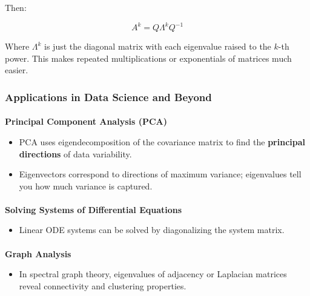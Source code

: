 \documentclass[
  letterpaper,
  DIV=11,
  numbers=noendperiod]{scrartcl}
\makeatletter
\let\oldparagraph\paragraph
\renewcommand{\paragraph}{
    \@ifstar
      \xxxParagraphStar
      \xxxParagraphNoStar
  }
\newcommand{\xxxParagraphStar}[1]{\oldparagraph*{#1}\mbox{}}
\newcommand{\xxxParagraphNoStar}[1]{\oldparagraph{#1}\mbox{}}
\providecommand{\tightlist}{%
  \setlength{\itemsep}{0pt}\setlength{\parskip}{0pt}}\usepackage{longtable,booktabs,array}
\makeatother
\begin{document}
Then:

\[
A^k = Q \Lambda^k Q^{-1}
\]

Where \(\Lambda^k\) is just the diagonal matrix with each eigenvalue
raised to the \(k\)-th power. This makes repeated multiplications or
exponentials of matrices much easier.

\subsubsection{Applications in Data Science and
Beyond}\label{applications-in-data-science-and-beyond}

\paragraph{\texorpdfstring{\textbf{Principal Component Analysis
(PCA)}}{Principal Component Analysis (PCA)}}\label{principal-component-analysis-pca}

\begin{itemize}
\tightlist
\item
  PCA uses eigendecomposition of the covariance matrix to find the
  \textbf{principal directions} of data variability.
\item
  Eigenvectors correspond to directions of maximum variance; eigenvalues
  tell you how much variance is captured.
\end{itemize}

\paragraph{\texorpdfstring{\textbf{Solving Systems of Differential
Equations}}{Solving Systems of Differential Equations}}\label{solving-systems-of-differential-equations}

\begin{itemize}
\tightlist
\item
  Linear ODE systems can be solved by diagonalizing the system matrix.
\end{itemize}

\paragraph{\texorpdfstring{\textbf{Graph
Analysis}}{Graph Analysis}}\label{graph-analysis}

\begin{itemize}
\tightlist
\item
  In spectral graph theory, eigenvalues of adjacency or Laplacian
  matrices reveal connectivity and clustering properties.
\end{itemize}
\end{document}
